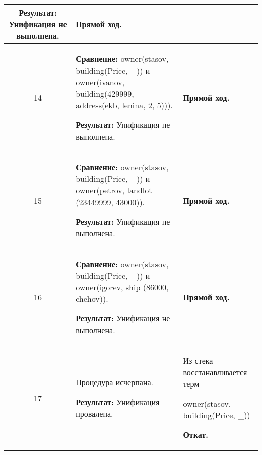 \begin{longtable}{|c|p{}|p{}|}
  \textbf{Результат:}\newline
  Унификация не выполнена.
                       &
  \textbf{Прямой ход.}
                       \\ \hline

14
                       &
\textbf{Сравнение:}\newline
  owner(stasov, building(Price, \_))
  \newline{}и\newline
  owner(ivanov, building(429999,   address(ekb, lenina, 2,  5))).
  \newline

  \textbf{Результат:}\newline
  Унификация не выполнена.
                       &
  \textbf{Прямой ход.}
                       \\ \hline

15
                       &
\textbf{Сравнение:}\newline
  owner(stasov, building(Price, \_))
  \newline{}и\newline
  owner(petrov, landlot (23449999, 43000)).
  \newline

  \textbf{Результат:}\newline
  Унификация не выполнена.
                       &
  \textbf{Прямой ход.}
                       \\ \hline

16
                       &
\textbf{Сравнение:}\newline
  owner(stasov, building(Price, \_))
  \newline{}и\newline
  owner(igorev, ship    (86000,    chehov)).
  \newline

  \textbf{Результат:}\newline
  Унификация не выполнена.
                       &
  \textbf{Прямой ход.}
                       \\ \hline

17
                       &
  Процедура исчерпана.

  \textbf{Результат:}\newline
  Унификация провалена.
                       &
  Из стека восстанавливается терм

  owner(stasov, building(Price, \_))
  \newline

  \textbf{Откат.}
  \newline


\end{longtable}
